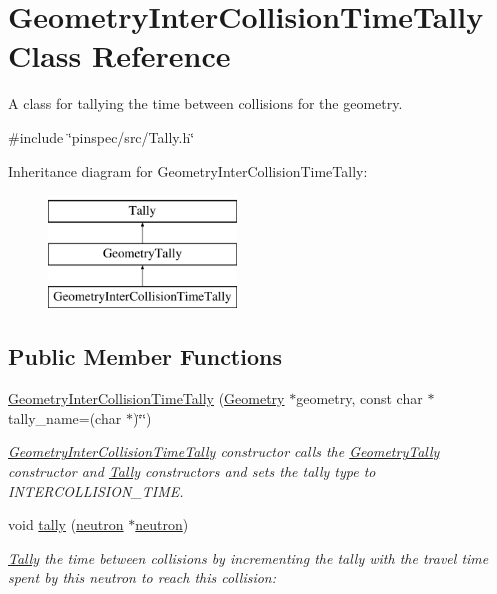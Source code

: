 \hypertarget{classGeometryInterCollisionTimeTally}{\section{Geometry\-Inter\-Collision\-Time\-Tally Class Reference}
\label{classGeometryInterCollisionTimeTally}
}


A class for tallying the time between collisions for the geometry.  




{\ttfamily \#include \char`\"{}pinspec/src/\-Tally.\-h\char`\"{}}

Inheritance diagram for Geometry\-Inter\-Collision\-Time\-Tally\-:\begin{figure}[H]
\begin{center}
\leavevmode
\includegraphics[height=3.000000cm]{classGeometryInterCollisionTimeTally}
\end{center}
\end{figure}
\subsection*{Public Member Functions}
\begin{DoxyCompactItemize}
\item 
\hyperlink{classGeometryInterCollisionTimeTally_abeda6d89eff389576d4f4b5e8a6b5987}{Geometry\-Inter\-Collision\-Time\-Tally} (\hyperlink{classGeometry}{Geometry} $\ast$geometry, const char $\ast$tally\-\_\-name=(char $\ast$)\char`\"{}\char`\"{})
\begin{DoxyCompactList}\small\item\em \hyperlink{classGeometryInterCollisionTimeTally}{Geometry\-Inter\-Collision\-Time\-Tally} constructor calls the \hyperlink{classGeometryTally}{Geometry\-Tally} constructor and \hyperlink{classTally}{Tally} constructors and sets the tally type to I\-N\-T\-E\-R\-C\-O\-L\-L\-I\-S\-I\-O\-N\-\_\-\-T\-I\-M\-E. \end{DoxyCompactList}\item 
void \hyperlink{classGeometryInterCollisionTimeTally_a8190817fa635809c6ae1bdadd9665ef8}{tally} (\hyperlink{structneutron}{neutron} $\ast$\hyperlink{structneutron}{neutron})
\begin{DoxyCompactList}\small\item\em \hyperlink{classTally}{Tally} the time between collisions by incrementing the tally with the travel time spent by this neutron to reach this collision\-: \end{DoxyCompactList}\end{DoxyCompactItemize}
